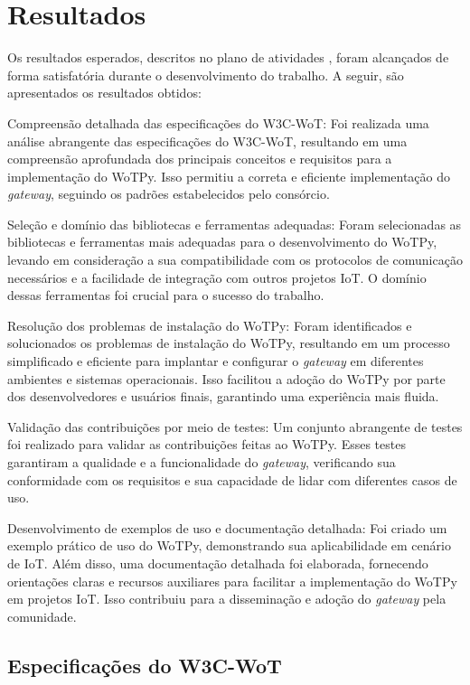 \chapter{Resultados}

Os resultados esperados, descritos no plano de atividades , foram alcançados de forma satisfatória durante o desenvolvimento do trabalho. A seguir, são apresentados os resultados obtidos:

Compreensão detalhada das especificações do W3C-WoT: Foi realizada uma análise abrangente das especificações do W3C-WoT, resultando em uma compreensão aprofundada dos principais conceitos e requisitos para a implementação do WoTPy. Isso permitiu a correta e eficiente implementação do \textit{gateway}, seguindo os padrões estabelecidos pelo consórcio.

Seleção e domínio das bibliotecas e ferramentas adequadas: Foram selecionadas as bibliotecas e ferramentas mais adequadas para o desenvolvimento do WoTPy, levando em consideração a sua compatibilidade com os protocolos de comunicação necessários e a facilidade de integração com outros projetos IoT. O domínio dessas ferramentas foi crucial para o sucesso do trabalho.

Resolução dos problemas de instalação do WoTPy: Foram identificados e solucionados os problemas de instalação do WoTPy, resultando em um processo simplificado e eficiente para implantar e configurar o \textit{gateway} em diferentes ambientes e sistemas operacionais. Isso facilitou a adoção do WoTPy por parte dos desenvolvedores e usuários finais, garantindo uma experiência mais fluida.

Validação das contribuições por meio de testes: Um conjunto abrangente de testes foi realizado para validar as contribuições feitas ao WoTPy. Esses testes garantiram a qualidade e a funcionalidade do \textit{gateway}, verificando sua conformidade com os requisitos e sua capacidade de lidar com diferentes casos de uso.

Desenvolvimento de exemplos de uso e documentação detalhada: Foi criado um exemplo prático de uso do WoTPy, demonstrando sua aplicabilidade em cenário de IoT. Além disso, uma documentação detalhada foi elaborada, fornecendo orientações claras e recursos auxiliares para facilitar a implementação do WoTPy em projetos IoT. Isso contribuiu para a disseminação e adoção do \textit{gateway} pela comunidade.

\section{Especificações do W3C-WoT}

